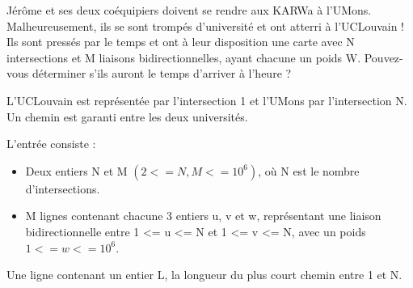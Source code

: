 \problemname{\problemyamlname}



Jérôme et ses deux coéquipiers doivent se rendre aux KARWa à l'UMons. Malheureusement, ils se sont trompés d'université et ont atterri à l'UCLouvain !
Ils sont pressés par le temps et ont à leur disposition une carte avec N intersections et M liaisons bidirectionnelles, ayant chacune un poids W.
Pouvez-vous déterminer s'ils auront le temps d'arriver à l'heure ?

L'UCLouvain est représentée par l'intersection 1 et l'UMons par l'intersection N. Un chemin est garanti entre les deux universités.

\begin{Input}
    L'entrée consiste :
    \begin{itemize}
        \item Deux entiers N et M $(2 <= N, M <= 10^6)$, où N est le nombre d'intersections.
        \item  M lignes contenant chacune 3 entiers u, v et w, représentant une liaison bidirectionnelle entre 1 <= u <= N et 1 <= v <= N, avec un poids $1 <= w <= 10^6$.
    \end{itemize}
\end{Input}

\begin{Output}
    Une ligne contenant un entier L, la longueur du plus court chemin entre 1 et N.
\end{Output}
